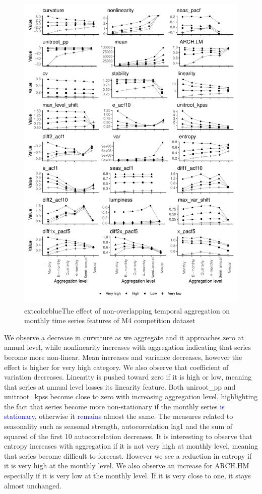 \documentclass[preprint, 3p,
authoryear]{elsarticle} %
\begin{document}
\begin{figure}[H]

{\centering \includegraphics[width=0.7\linewidth]{img/mp_category_all1} 

}

\caption{   extcolor{blue}{The effect of non-overlapping temporal aggregation on monthly time series features of M4 competition dataset} }\label{fig:featureagg1}
\end{figure}

We observe a decrease in curvature as we aggregate and it approaches
zero at annual level, while nonlinearity increases with aggregation
indicating that series become more non-linear. Mean increases and
variance decreases, however the effect is higher for very high category.
We also observe that coefficient of variation decreases. Linearity is
pushed toward zero if it is high or low, meaning that series at annual
level losses its linearity feature. Both uniroot\_pp and unitroot\_kpss
become close to zero with increasing aggregation level, highlighting the
fact that series become more non-stationary if the monthly series
\textcolor{blue}{is stationary}, otherwise it \textcolor{blue}{remains}
almost the same. The measures related to seasonality such as seasonal
strength, autocorrelation lag1 and the sum of squared of the first 10
autocorrelation decreases. It is interesting to observe that entropy
increases with aggregation if it is not very high at monthly level,
meaning that series become difficult to forecast. However we see a
reduction in entropy if it is very high at the monthly level. We also
observe an increase for ARCH.HM especially if it is very low at the
monthly level. If it is very close to one, it stays almost unchanged.
\end{document}
